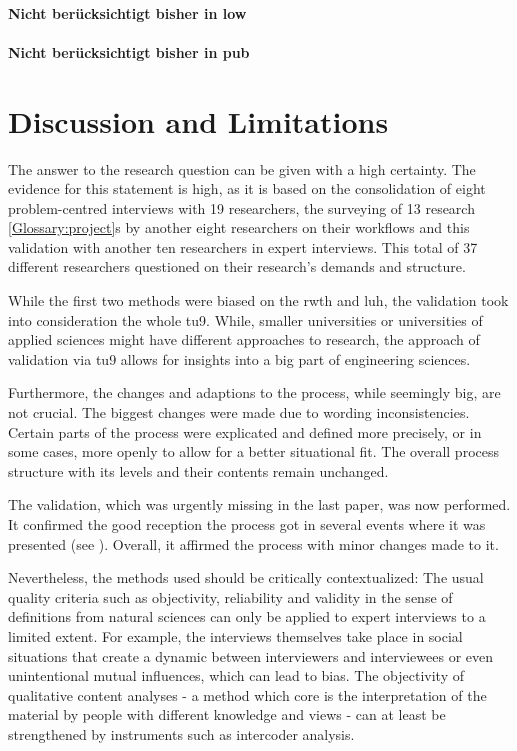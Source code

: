\documentclass{bausteinefdm}
\begin{document}
\paragraph{Nicht berücksichtigt bisher in low}


\paragraph{Nicht berücksichtigt bisher in pub}

\fi

\section{Discussion and Limitations}
\label{Discussion}

The answer to the research question can be given with a high certainty.
The evidence for this statement is high, as it is
based on the consolidation of 
eight problem-centred interviews with 19 researchers, 
the surveying of 13 research \ref{Glossary:project}s by another eight researchers on their workflows
and this validation with another ten researchers in expert interviews.
This total of 37 different researchers questioned on their research's demands and structure.

While the first two methods were biased on the \ac{rwth} and \ac{luh}, the validation took into consideration the whole \ac{tu9}.
While, smaller universities or universities of applied sciences might have different approaches to research, the approach of validation via \ac{tu9} allows for insights into a big part of engineering sciences.

Furthermore, the changes and adaptions to the process, while seemingly big, are not crucial.
The biggest changes were made due to wording inconsistencies.
Certain parts of the process were explicated and defined more precisely, or in some cases, more openly to allow for a better situational fit.
The overall process structure with its levels and their contents remain unchanged.

The validation, which was urgently missing in the last paper, was now performed.
It confirmed the good reception the process got in several events where it was presented (see \cite{Hamann.2022,Hamann.2023,Hamann.2023b,Hamann.2023c}).
Overall, it affirmed the process with minor changes made to it.

Nevertheless, the methods used should be critically contextualized: The usual quality criteria such as objectivity, reliability and validity in the sense of definitions from natural sciences can only be applied to expert interviews to a limited extent. For example, the interviews themselves take place in social situations that create a dynamic between interviewers and interviewees or even unintentional mutual influences, which can lead to bias. \cite{Bogner.2014} The objectivity of qualitative content analyses - a method which core is the interpretation of the material by people with different knowledge and views - can at least be strengthened by instruments such as intercoder analysis. \cite{Mayring.2022}
\end{document}
